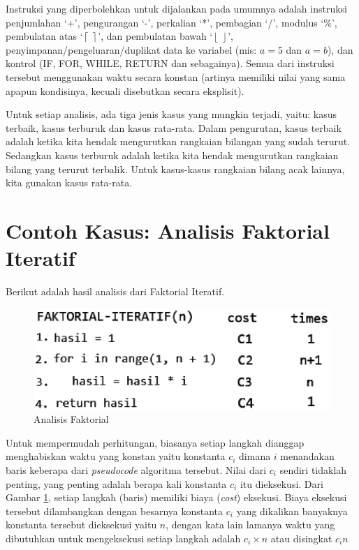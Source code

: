 Instruksi yang diperbolehkan untuk dijalankan pada umumnya adalah instruksi penjumlahan `+', pengurangan `-', perkalian `*', pembagian `/', modulus `\%', pembulatan atas `$\left\lceil\  \right\rceil$', dan pembulatan bawah `$\left\lfloor\ \right\rfloor$', penyimpanan/pengeluaran/duplikat data ke variabel (mis: $a = 5$ dan $a = b$), dan kontrol (IF, FOR, WHILE, RETURN dan sebagainya). Semua dari instruksi tersebut menggunakan waktu secara konstan (artinya memiliki nilai yang sama apapun kondisinya, kecuali disebutkan secara eksplisit).

Untuk setiap analisis, ada tiga jenis kasus yang mungkin terjadi, yaitu: kasus terbaik, kasus terburuk dan kasus rata-rata. Dalam pengurutan, kasus terbaik adalah ketika kita hendak mengurutkan rangkaian bilangan yang sudah terurut. Sedangkan kasus terburuk adalah ketika kita hendak mengurutkan rangkaian bilang yang terurut terbalik. Untuk kasus-kasus rangkaian bilang acak lainnya, kita gunakan kasus rata-rata.

\section{Contoh Kasus: Analisis Faktorial Iteratif}
Berikut adalah hasil analisis dari Faktorial Iteratif.
\begin{figure}%
\includegraphics[scale=0.5]{fig/faktorialAnalysis}%
\caption{Analisis Faktorial}%
\label{fig:faktorialAnalysis}%
\end{figure}

\FloatBarrier
Untuk mempermudah perhitungan, biasanya setiap langkah dianggap menghabiskan waktu yang konstan yaitu konstanta $c_i$ dimana $i$ menandakan baris keberapa dari \textit{pseudocode} algoritma tersebut. Nilai dari $c_i$ sendiri tidaklah penting, yang penting adalah berapa kali konstanta $c_i$ itu dieksekusi. Dari Gambar \ref{fig:faktorialAnalysis}, setiap langkah (baris) memiliki biaya (\textit{cost}) eksekusi. 
Biaya eksekusi tersebut dilambangkan dengan besarnya konstanta $c_i$ yang dikalikan banyaknya konstanta tersebut dieksekusi yaitu $n$, dengan kata lain lamanya waktu yang dibutuhkan untuk mengeksekusi setiap langkah adalah $c_{i}\times{}n$ atau disingkat $c_{i}n$

